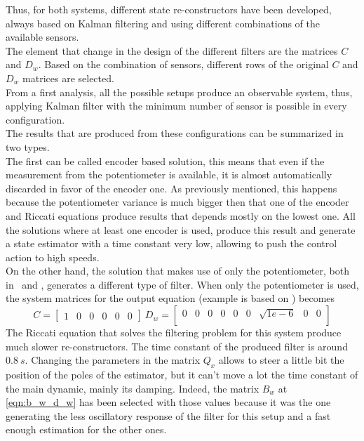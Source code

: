 Thus, for both systems, different state re-constructors have been developed, always based on Kalman filtering and using different combinations of the available sensors. \\
The element that change in the design of the different filters are the matrices $C$ and $D_w$. Based on the combination of sensors, different rows of the original $C$ and $D_w$ matrices are selected. \\
From a first analysis, all the possible setups produce an observable system, thus, applying Kalman filter with the minimum number of sensor is possible in every configuration. \\

The results that are produced from these configurations can be summarized in two types. \\ 

The first can be called encoder based solution, this means that even if the measurement from the potentiometer is available, it is almost automatically discarded in favor of the encoder one. As previously mentioned, this happens because the potentiometer variance is much bigger then that one of the encoder and Riccati equations produce results that depends mostly on the lowest one. All the solutions where at least one encoder is used, produce this result and generate a state estimator with a time constant very low, allowing to push the control action to high speeds.\\

On the other hand, the solution that makes use of only the potentiometer, both in \onedof\ and \twodof, generates a different type of filter. When only the potentiometer is used, the system matrices for the output equation (example is based on \twodof) becomes 
\begin{equation}
	C = \begin{bmatrix}
		1 & 0 & 0 & 0 & 0 & 0
	\end{bmatrix} \
	D_w = \begin{bmatrix}
		0 & 0 & 0 & 0 & 0 & 0 & \sqrt{1e-6} & 0 & 0 \\
	\end{bmatrix} 
\end{equation}
The Riccati equation that solves the filtering problem for this system produce much slower re-constructors. The time constant of the produced filter is around~$0.8\ s$. Changing the parameters in the matrix $Q_x$ allows to steer a little bit the position of the poles of the estimator, but it can't move a lot the time constant of the main dynamic, mainly its damping. Indeed, the matrix $B_w$ at \ref{eqn:b_w_d_w} has been selected with those values because it was the one generating the less oscillatory response of the filter for this setup and a fast enough estimation for the other ones.\\

